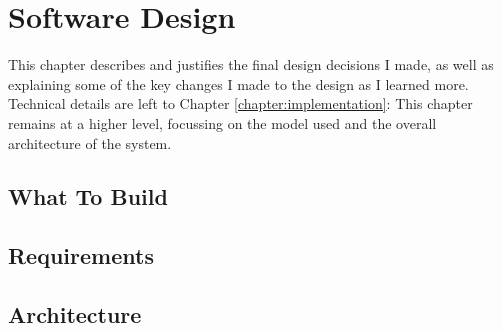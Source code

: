 \chapter{Software Design}
\label{chapter:design}
  This chapter describes and justifies the final design decisions I made, as well as explaining some of the key changes I made to the design as I learned more. Technical details are left to Chapter \ref{chapter:implementation}: This chapter remains at a higher level, focussing on the model used and the overall architecture of the system.

  \section{What To Build}
  \section{Requirements}
    \todo{\item}

  \section{Architecture}
